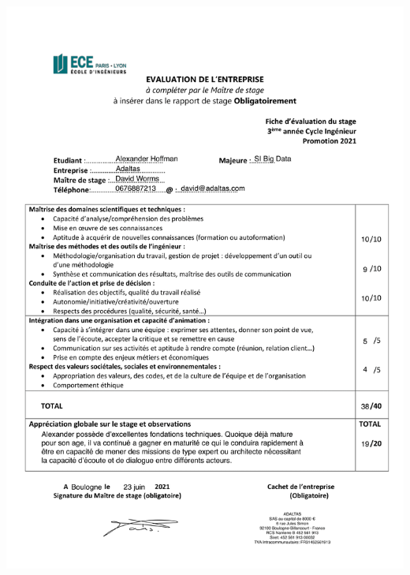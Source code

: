 \documentclass[12pt, french]{report}
\begin{document}
\printglossaries

\includegraphics[scale=0.25]{assets/img/evaluation.png}
\end{document}

